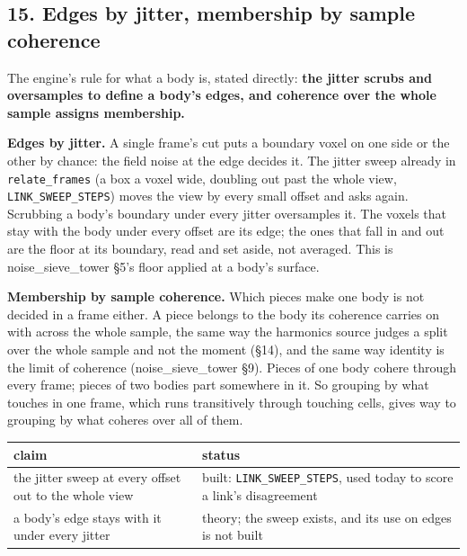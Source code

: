 \subsection{\texorpdfstring{15. Edges by jitter, membership by sample coherence}{15. Edges by jitter, membership by sample coherence}}

The engine's rule for what a body is, stated directly: \textbf{the jitter scrubs and oversamples to define a body's edges, and coherence over the whole sample assigns membership.}

\textbf{Edges by jitter.} A single frame's cut puts a boundary voxel on one side or the other by chance: the field noise at the edge decides it. The jitter sweep already in \texttt{relate\_\allowbreak{}frames} (a box a voxel wide, doubling out past the whole view, \texttt{LINK\_\allowbreak{}SWEEP\_\allowbreak{}STEPS}) moves the view by every small offset and asks again. Scrubbing a body's boundary under every jitter oversamples it. The voxels that stay with the body under every offset are its edge; the ones that fall in and out are the floor at its boundary, read and set aside, not averaged. This is noise\_\allowbreak{}sieve\_\allowbreak{}tower §5's floor applied at a body's surface.

\textbf{Membership by sample coherence.} Which pieces make one body is not decided in a frame either. A piece belongs to the body its coherence carries on with across the whole sample, the same way the harmonics source judges a split over the whole sample and not the moment (§14), and the same way identity is the limit of coherence (noise\_\allowbreak{}sieve\_\allowbreak{}tower §9). Pieces of one body cohere through every frame; pieces of two bodies part somewhere in it. So grouping by what touches in one frame, which runs transitively through touching cells, gives way to grouping by what coheres over all of them.

{\small
\setlength{\tabcolsep}{6pt}
\begin{longtable}{>{\RaggedRight\arraybackslash}p{}>{\RaggedRight\arraybackslash}p{}}
\toprule
claim & status \\
\midrule
\endhead
the jitter sweep at every offset out to the whole view & built: \texttt{LINK\_\allowbreak{}SWEEP\_\allowbreak{}STEPS}, used today to score a link's disagreement \\
a body's edge stays with it under every jitter & theory; the sweep exists, and its use on edges is not built \\
\bottomrule
\end{longtable}
}

